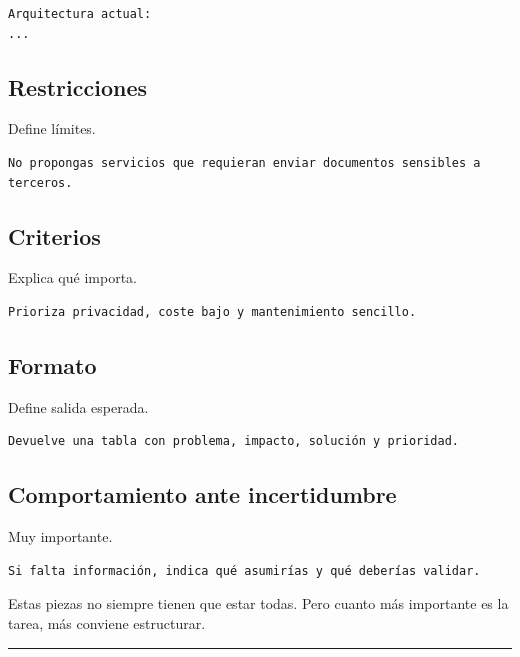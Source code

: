 \begin{lstlisting}
Arquitectura actual:
...
\end{lstlisting}

\subsection{Restricciones}\label{restricciones}

Define límites.

\begin{lstlisting}
No propongas servicios que requieran enviar documentos sensibles a terceros.
\end{lstlisting}

\subsection{Criterios}\label{criterios}

Explica qué importa.

\begin{lstlisting}
Prioriza privacidad, coste bajo y mantenimiento sencillo.
\end{lstlisting}

\subsection{Formato}\label{formato}

Define salida esperada.

\begin{lstlisting}
Devuelve una tabla con problema, impacto, solución y prioridad.
\end{lstlisting}

\subsection{Comportamiento ante
incertidumbre}\label{comportamiento-ante-incertidumbre}

Muy importante.

\begin{lstlisting}
Si falta información, indica qué asumirías y qué deberías validar.
\end{lstlisting}

Estas piezas no siempre tienen que estar todas. Pero cuanto más
importante es la tarea, más conviene estructurar.

\begin{center}\rule{0.5\linewidth}{0.5pt}\end{center}


